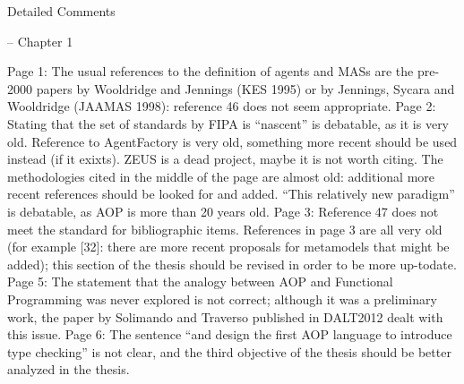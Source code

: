 \documentclass{article}
\newenvironment{them}{\noindent\begingroup\color{blue}}{\endgroup\par}
\begin{document}
\begin{them}
Detailed Comments

-- Chapter 1

Page 1:
The usual references to the definition of agents and MASs are the pre-2000 papers by Wooldridge
and Jennings (KES 1995) or by Jennings, Sycara and Wooldridge (JAAMAS 1998): reference 46 does
not seem appropriate.
Page 2:
Stating that the set of standards by FIPA is “nascent” is debatable, as it is very old.
Reference to AgentFactory is very old, something more recent should be used instead (if it exixts).
ZEUS is a dead project, maybe it is not worth citing.
The methodologies cited in the middle of the page are almost old: additional more recent references
should be looked for and added.
“This relatively new paradigm” is debatable, as AOP is more than 20 years old.
Page 3:
Reference 47 does not meet the standard for bibliographic items.
References in page 3 are all very old (for example [32]: there are more recent proposals for metamodels
that might be added); this section of the thesis should be revised in order to be more up-todate.
Page 5:
The statement that the analogy between AOP and Functional Programming was never explored is not
correct; although it was a preliminary work, the paper by Solimando and Traverso published in
DALT2012 dealt with this issue.
Page 6:
The sentence “and design the first AOP language to introduce type checking” is not clear, and the
third objective of the thesis should be better analyzed in the thesis.
\end{them}
\end{document}
